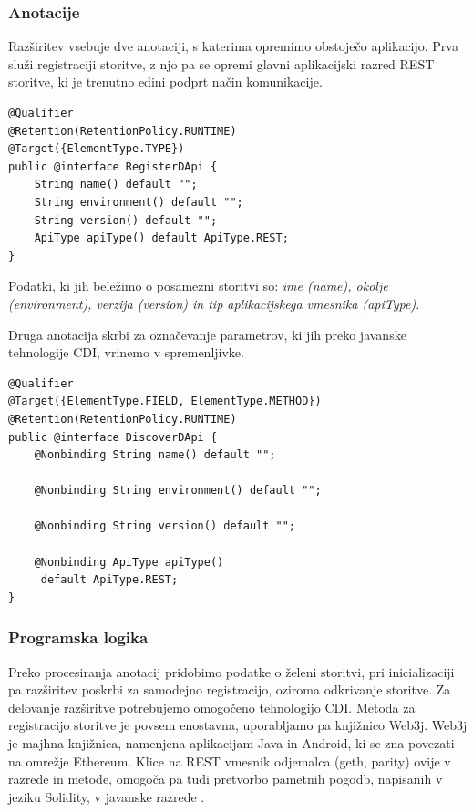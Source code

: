 \documentclass[a4paper, 12pt]{book}
\begin{document}
\subsubsection{Anotacije}
Razširitev vsebuje dve anotaciji, s katerima opremimo obstoječo aplikacijo.
Prva služi registraciji storitve, z njo pa se opremi glavni aplikacijski razred REST storitve, ki je trenutno edini podprt način komunikacije.

\begin{lstlisting}
@Qualifier
@Retention(RetentionPolicy.RUNTIME)
@Target({ElementType.TYPE})
public @interface RegisterDApi {
	String name() default "";
	String environment() default "";
	String version() default "";
	ApiType apiType() default ApiType.REST;
}
\end{lstlisting}

Podatki, ki jih beležimo o posamezni storitvi so: \textit{ime (name), okolje (environment), verzija (version) in tip aplikacijskega vmesnika (apiType)}.


Druga anotacija skrbi za označevanje parametrov, ki jih preko javanske tehnologije CDI, vrinemo v spremenljivke.

\begin{lstlisting}
@Qualifier
@Target({ElementType.FIELD, ElementType.METHOD})
@Retention(RetentionPolicy.RUNTIME)
public @interface DiscoverDApi {
	@Nonbinding String name() default "";
	
	@Nonbinding String environment() default "";
	
	@Nonbinding String version() default "";
	
	@Nonbinding ApiType apiType()
	 default ApiType.REST;
}
\end{lstlisting}

\subsubsection{Programska logika}
Preko procesiranja anotacij pridobimo podatke o želeni storitvi, pri inicializaciji pa razširitev poskrbi za samodejno registracijo, oziroma odkrivanje storitve.
Za delovanje razširitve potrebujemo omogočeno tehnologijo CDI.
Metoda za registracijo storitve je povsem enostavna, uporabljamo pa knjižnico Web3j.
Web3j je majhna knjižnica, namenjena aplikacijam Java in Android, ki se zna povezati na omrežje Ethereum.
Klice na REST vmesnik odjemalca (geth, parity) ovije v razrede in metode, omogoča pa tudi pretvorbo pametnih pogodb, napisanih v jeziku Solidity, v javanske razrede \cite{web3j}.
\end{document}
